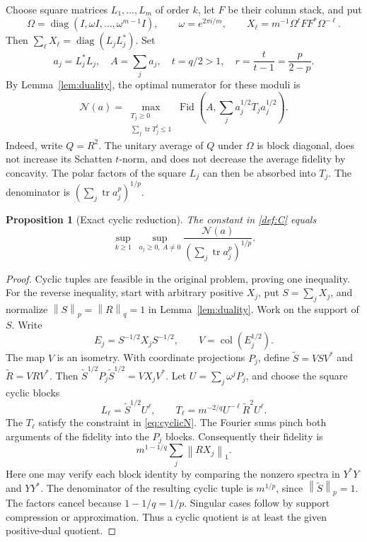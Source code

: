 \documentclass[11pt]{article}
\newcommand{\tr}{\operatorname{tr}}
\newcommand{\Fid}{\operatorname{Fid}}
\newcommand{\diag}{\operatorname{diag}}
\newcommand{\norm}[1]{\left\lVert#1\right\rVert}
\newcommand{\N}{\mathcal N}
\newtheorem{proposition}[theorem]{Proposition}
\theoremstyle{remark}\newtheorem{remark}[theorem]{Remark}
\begin{document}
Choose square matrices \(L_1,\ldots,L_m\) of order \(k\), let \(F\) be their column stack, and put
\[
 \Omega=\diag(I,\omega I,\ldots,\omega^{m-1}I),\qquad \omega=e^{2\pi i/m},
 \qquad X_\ell=m^{-1}\Omega^\ell FF^*\Omega^{-\ell}.
\]
Then \(\sum_\ell X_\ell=\diag(L_jL_j^*)\). Set
\[
 a_j=L_j^*L_j,\quad A=\sum_ja_j,\quad
 t=q/2>1,\quad r=\frac{t}{t-1}=\frac p{2-p}.
\]
By Lemma~\ref{lem:duality}, the optimal numerator for these moduli is
\begin{equation}\label{eq:cyclicN}
 \N(a)=\max_{\substack{T_j\ge0\\\sum_j\tr T_j^t\le1}}
 \Fid\left(A,\sum_ja_j^{1/2}T_ja_j^{1/2}\right).
\end{equation}
Indeed, write \(Q=R^2\). The unitary average of \(Q\) under \(\Omega\) is block diagonal, does not increase its Schatten \(t\)-norm, and does not decrease the average fidelity by concavity. The polar factors of the square \(L_j\) can then be absorbed into \(T_j\). The denominator is \((\sum_j\tr a_j^p)^{1/p}\).

\begin{proposition}[Exact cyclic reduction]\label{prop:cyclic}
The constant in \eqref{def:C} equals
\begin{equation}\label{eq:cyclicsup}
 \sup_{k\ge1}\ \sup_{a_j\ge0,\ A\ne0}
 \frac{\N(a)}{(\sum_j\tr a_j^p)^{1/p}}.
\end{equation}
\end{proposition}
\begin{proof}
Cyclic tuples are feasible in the original problem, proving one inequality. For the reverse inequality, start with arbitrary positive \(X_j\), put \(S=\sum_jX_j\), and normalize \(\norm S_p=\norm R_q=1\) in Lemma~\ref{lem:duality}. Work on the support of \(S\). Write
\[
 E_j=S^{-1/2}X_jS^{-1/2},\qquad V=\operatorname{col}(E_j^{1/2}).
\]
The map \(V\) is an isometry. With coordinate projections \(P_j\), define
\(\widetilde S=VSV^*\) and \(\widetilde R=VRV^*\). Then
\(\widetilde S^{1/2}P_j\widetilde S^{1/2}=VX_jV^*\).
Let \(U=\sum_j\omega^jP_j\), and choose the square cyclic blocks
\[
 L_\ell=\widetilde S^{1/2}U^\ell,\qquad
 T_\ell=m^{-2/q}U^{-\ell}\widetilde R^2U^\ell.
\]
The \(T_\ell\) satisfy the constraint in \eqref{eq:cyclicN}. The Fourier sums pinch both arguments of the fidelity into the \(P_j\) blocks. Consequently their fidelity is
\[
 m^{1-1/q}\sum_j\norm{RX_j}_1.
\]
Here one may verify each block identity by comparing the nonzero spectra in \(Y^*Y\) and \(YY^*\). The denominator of the resulting cyclic tuple is \(m^{1/p}\), since \(\norm{\widetilde S}_p=1\). The factors cancel because \(1-1/q=1/p\). Singular cases follow by support compression or approximation. Thus a cyclic quotient is at least the given positive-dual quotient.
\end{proof}
\end{document}
